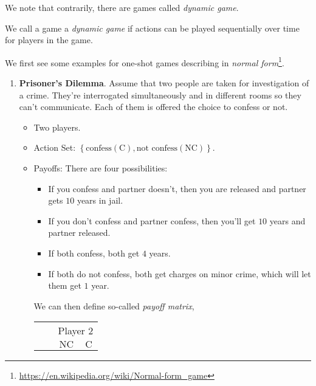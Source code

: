 We note that contrarily, there are games called \emph{dynamic game}.
\begin{definition}
	We call a game a \emph{dynamic game} if actions can be played sequentially over time for players in the game.
\end{definition}

\begin{eg}
	We first see some examples for one-shot games describing in \emph{normal form}\footnote{\url{https://en.wikipedia.org/wiki/Normal-form_game}}.
	\begin{enumerate}
		\item \textbf{Prisoner's Dilemma}. Assume that two people are taken for investigation of a crime. They're interrogated simultaneously and in different rooms so
		      they can't communicate. Each of them is offered the choice to confess or not.
		      \begin{itemize}
			      \item Two players.
			      \item Action Set: \(\left\{\text{confess}(\mathrm{C}), \text{not confess}(\mathrm{NC})\right\}\).
			      \item Payoffs: There are four possibilities:
			            \begin{itemize}
				            \item If you confess and partner doesn't, then you are released and partner gets \(10\) years in jail.
				            \item If you don't confess and partner confess, then you'll get \(10\) years and partner released.
				            \item If both confess, both get \(4\) years.
				            \item If both do not confess, both get charges on minor crime, which will let them get \(1\) year.
			            \end{itemize}
			            We can then define so-called \emph{payoff matrix},
			            \begin{table}[H]
				            \centering
				            \setlength{\extrarowheight}{2pt}
				            \begin{tabular}{cc|c|c|}
					                                      & \multicolumn{1}{c}{} & \multicolumn{2}{c}{Player $2$}                                       \\
					                                      & \multicolumn{1}{c}{} & \multicolumn{1}{c}{$\mathrm{NC}$} & \multicolumn{1}{c}{$\mathrm{C}$} \\\cline{3-4}

\end{tabular}
\end{table}
\end{itemize}
\end{enumerate}
\end{eg}
